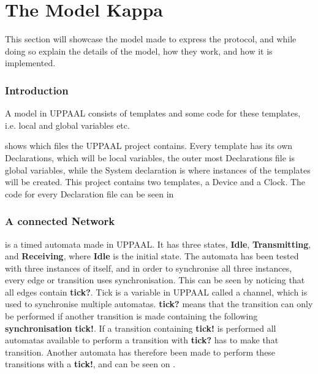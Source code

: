 \section{The Model Kappa}
This section will showcase the model made to express the protocol, and while doing so explain the details of the model, how they work, and how it is implemented.

\subsubsection{Introduction}
A model in UPPAAL consists of templates and some code for these templates, i.e. local and global variables etc.


 shows which files the UPPAAL project contains. 
Every template has its own Declarations, which will be local variables, the outer most Declarations file is global variables, while the System declaration is where instances of the templates will be created.
This project contains two templates, a Device and a Clock.
The code for every Declaration file can be seen in 

\subsubsection{A connected Network}

 is a timed automata made in UPPAAL.
It has three states, \textbf{Idle}, \textbf{Transmitting}, and \textbf{Receiving}, where \textbf{Idle} is the initial state.
The automata has been tested with three instances of itself, and in order to synchronise all three instances, every edge or transition uses synchronisation.
This can be seen by noticing that all edges contain \textbf{tick?}. 
Tick is a variable in UPPAAL called a channel, which is used to synchronise multiple automatas.
\textbf{tick?} means that the transition can only be performed if another transition is made containing the following \textbf{synchronisation} \textbf{tick!}.
If a transition containing \textbf{tick!} is performed all automatas available to perform a transition with \textbf{tick?} has to make that transition.
Another automata has therefore been made to perform these transitions with a \textbf{tick!}, and can be seen on .

